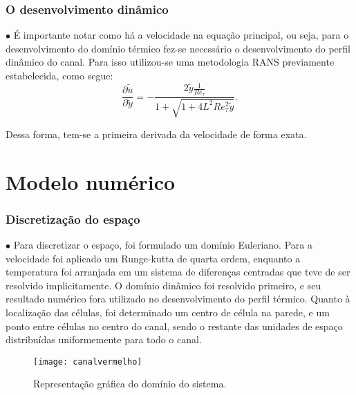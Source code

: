 \documentclass[xcolor=dvipsnames,10pt,aspectratio=169]{beamer}
\begin{document}
	
	
		\begin{frame}
			\frametitle{O desenvolvimento dinâmico}
			$\bullet$ É importante notar como há a velocidade na equação principal, ou seja, para o desenvolvimento do domínio térmico fez-se necessário o desenvolvimento do perfil dinâmico do canal. Para isso utilizou-se uma metodologia RANS previamente estabelecida, como segue: 
				\begin{equation}
				\frac{\partial \tilde{\overline{u}}}{\partial \tilde{y}} = - \frac{2 \tilde{y} \frac{1}{Re_\tau} }{ 1 + \sqrt{ 1 + 4 L ^2 Re_\tau ^2 \tilde{y}}}.
				\end{equation}	
				
			Dessa forma, tem-se a primeira derivada da velocidade de forma exata.
		\end{frame}
	
	

	
	
	\section{Modelo numérico}
		
	
	
	
		
		\begin{frame}
			\frametitle{Discretização do espaço}
			\begin{minipage}[h!]{0.5\textwidth}
			$\bullet$ Para discretizar o espaço, foi formulado um domínio Euleriano. Para a velocidade foi aplicado um Runge-kutta de quarta ordem, enquanto a temperatura foi arranjada em um sistema de diferenças centradas que teve de ser resolvido implicitamente. O domínio dinâmico foi resolvido primeiro, e seu resultado numérico fora utilizado no desenvolvimento do perfil térmico. Quanto à localização das células, foi determinado um centro de célula na parede, e um ponto entre células no centro do canal, sendo o restante das unidades de espaço distribuídas uniformemente para todo o canal.
			\end{minipage}\hfill
			\begin{minipage}[h!]{0.45\textwidth}
			\begin{figure}
				\centering
				\texttt{[image: canalvermelho]}
				\caption{Representação gráfica do domínio do sistema.}
				\label{sistema}
			\end{figure}
			\end{minipage}\\
		\end{frame}
	
\end{document}
